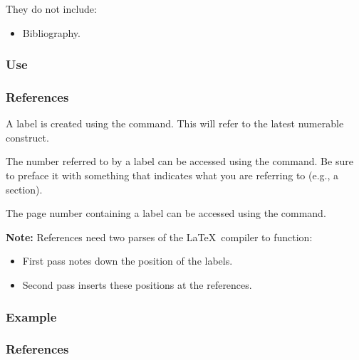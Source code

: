 {\begin{frame}[fragile]
  \vspace{5mm}
  They do not include:
  \begin{itemize}
    \item Bibliography.
  \end{itemize}
\end{frame}

\subsubsection{Use}
\begin{frame}[fragile]
  \frametitle{References }
  \vspace{3mm}
  A label is created using the  command. This will refer to the latest numerable construct.
  
  \vspace{5mm}
  The number referred to by a label can be accessed using the  command. Be sure to preface it with something that indicates what you are referring to (e.g., a section).
  
  \vspace{5mm}
  The page number containing a label can be accessed using the  command.
  
  \vspace{5mm}
  \textbf{Note:} References need two parses of the \LaTeX\ compiler to function:
  \begin{itemize}
    \item First pass notes down the position of the labels.
    \item Second pass inserts these positions at the references.
  \end{itemize}
\end{frame}

\subsubsection{Example}
\begin{frame}[fragile]
  \frametitle{References }
\end{frame}}

